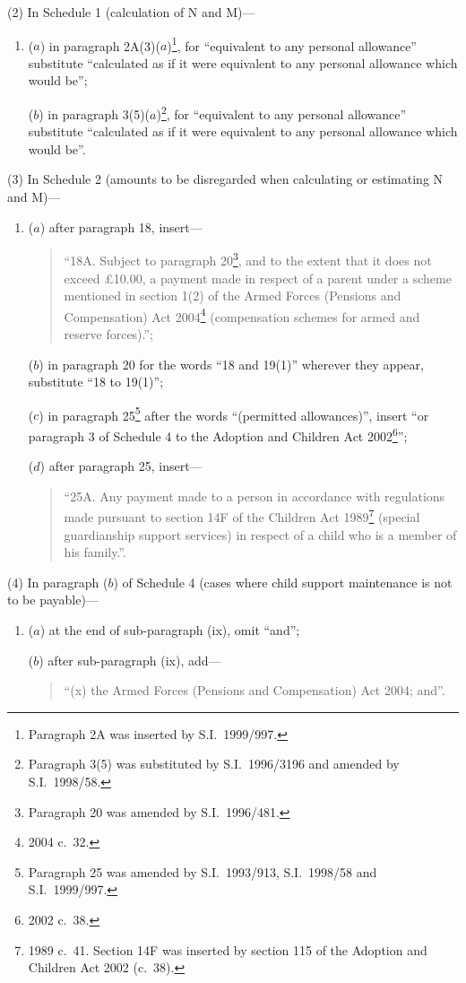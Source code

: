 \documentclass[12pt,a4paper]{article}
\begin{document}
(2) In Schedule 1 (calculation of N and M)—
\begin{enumerate}\item[]
($a$) in paragraph 2A(3)($a$)\footnote{Paragraph 2A was inserted by S.I.\ 1999/997.}, for “equivalent to any personal allowance” substitute “calculated as if it were equivalent to any personal allowance which would be”;

($b$) in paragraph 3(5)($a$)\footnote{Paragraph 3(5) was substituted by S.I.\ 1996/3196 and amended by S.I.\ 1998/58.}, for “equivalent to any personal allowance” substitute “calculated as if it were equivalent to any personal allowance which would be”.
\end{enumerate}

(3) In Schedule 2 (amounts to be disregarded when calculating or estimating N and M)—
\begin{enumerate}\item[]
($a$) after paragraph 18, insert—
\begin{quotation}
“18A.  Subject to paragraph 20\footnote{Paragraph 20 was amended by S.I.\ 1996/481.}, and to the extent that it does not exceed £10$.$00, a payment made in respect of a parent under a scheme mentioned in section 1(2) of the Armed Forces (Pensions and Compensation) Act 2004\footnote{2004 c.\ 32.} (compensation schemes for armed and reserve forces).”;
\end{quotation}

($b$) in paragraph 20 for the words “18 and 19(1)” wherever they appear, substitute “18 to 19(1)”;

($c$) in paragraph 25\footnote{Paragraph 25 was amended by S.I.\ 1993/913, S.I.\ 1998/58 and S.I.\ 1999/997.} after the words “(permitted allowances)”, insert “or paragraph 3 of Schedule 4 to the Adoption and Children Act 2002\footnote{2002 c.\ 38.}”;

($d$) after paragraph 25, insert—
\begin{quotation}
“25A.  Any payment made to a person in accordance with regulations made pursuant to section 14F of the Children Act 1989\footnote{1989 c.\ 41. Section 14F was inserted by section 115 of the Adoption and Children Act 2002 (c.\ 38).} (special guardianship support services) in respect of a child who is a member of his family.”.
\end{quotation}
\end{enumerate}

(4) In paragraph ($b$)  of Schedule 4 (cases where child support maintenance is not to be payable)—
\begin{enumerate}\item[]
($a$) at the end of sub-paragraph (ix), omit “and”;

($b$) after sub-paragraph (ix), add—
\begin{quotation}
“(x) the Armed Forces (Pensions and Compensation) Act 2004; and”.
\end{quotation}
\end{enumerate}
\end{document}

